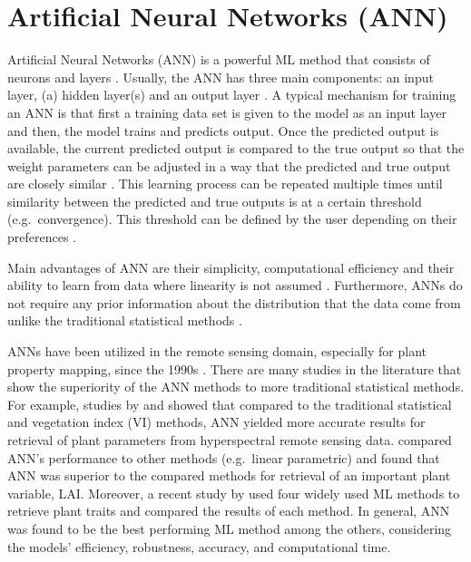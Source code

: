 \documentclass[a4paper, twoside]{templates/ociamthesis}
\begin{document}
\hypertarget{ann}{%
\section{Artificial Neural Networks (ANN)}\label{ann}}

Artificial Neural Networks (ANN) is a powerful ML method that consists of neurons and layers \citep{simon1999neural}. Usually, the ANN has three main components: an input layer, (a) hidden layer(s) and an output layer \citep{jensen1999predictive, quan2017radiative}. A typical mechanism for training an ANN is that first a training data set is given to the model as an input layer and then, the model trains and predicts output. Once the predicted output is available, the current predicted output is compared to the true output so that the weight parameters can be adjusted in a way that the predicted and true output are closely similar \citep{ingram2005mapping, quan2017radiative}. This learning process can be repeated multiple times until similarity between the predicted and true outputs is at a certain threshold (e.g.~convergence). This threshold can be defined by the user depending on their preferences \citep{jensen1999predictive, quan2017radiative}.

Main advantages of ANN are their simplicity, computational efficiency and their ability to learn from data where linearity is not assumed \citep{schlerf2006inversion, walczak2019artificial}. Furthermore, ANNs do not require any prior information about the distribution that the data come from unlike the traditional statistical methods \citep{walczak2019artificial}.

ANNs have been utilized in the remote sensing domain, especially for plant property mapping, since the 1990s \citep{verrelst2019quantifying}. There are many studies in the literature that show the superiority of the ANN methods to more traditional statistical methods. For example, studies by \citet{malenovsky2013retrieval} and \citet{kalacska2015estimation} showed that compared to the traditional statistical and vegetation index (VI) methods, ANN yielded more accurate results for retrieval of plant parameters from hyperspectral remote sensing data. \citet{neinavaz2016retrieval} compared ANN's performance to other methods (e.g.~linear parametric) and found that ANN was superior to the compared methods for retrieval of an important plant variable, LAI. Moreover, a recent study by \citet{danner2021efficient} used four widely used ML methods to retrieve plant traits and compared the results of each method. In general, ANN was found to be the best performing ML method among the others, considering the models' efficiency, robustness, accuracy, and computational time.
\end{document}
